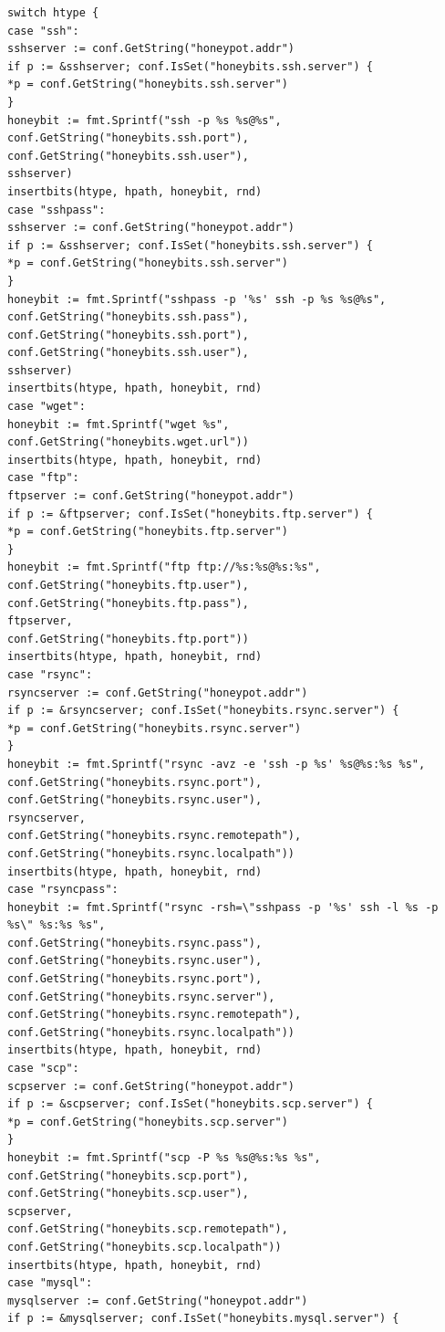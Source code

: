 \documentclass[grad,lot,lof,11pt,oneside,onehalfspace]{RUthesis}
\begin{document}
\begin{lstlisting}
switch htype {
case "ssh":
sshserver := conf.GetString("honeypot.addr")
if p := &sshserver; conf.IsSet("honeybits.ssh.server") {
*p = conf.GetString("honeybits.ssh.server")
}
honeybit := fmt.Sprintf("ssh -p %s %s@%s",
conf.GetString("honeybits.ssh.port"),
conf.GetString("honeybits.ssh.user"),
sshserver)
insertbits(htype, hpath, honeybit, rnd)
case "sshpass":
sshserver := conf.GetString("honeypot.addr")
if p := &sshserver; conf.IsSet("honeybits.ssh.server") {
*p = conf.GetString("honeybits.ssh.server")
}
honeybit := fmt.Sprintf("sshpass -p '%s' ssh -p %s %s@%s",
conf.GetString("honeybits.ssh.pass"),
conf.GetString("honeybits.ssh.port"),
conf.GetString("honeybits.ssh.user"),
sshserver)
insertbits(htype, hpath, honeybit, rnd)
case "wget":
honeybit := fmt.Sprintf("wget %s",
conf.GetString("honeybits.wget.url"))
insertbits(htype, hpath, honeybit, rnd)
case "ftp":
ftpserver := conf.GetString("honeypot.addr")
if p := &ftpserver; conf.IsSet("honeybits.ftp.server") {
*p = conf.GetString("honeybits.ftp.server")
}
honeybit := fmt.Sprintf("ftp ftp://%s:%s@%s:%s",
conf.GetString("honeybits.ftp.user"),
conf.GetString("honeybits.ftp.pass"),
ftpserver,
conf.GetString("honeybits.ftp.port"))
insertbits(htype, hpath, honeybit, rnd)
case "rsync":
rsyncserver := conf.GetString("honeypot.addr")
if p := &rsyncserver; conf.IsSet("honeybits.rsync.server") {
*p = conf.GetString("honeybits.rsync.server")
}
honeybit := fmt.Sprintf("rsync -avz -e 'ssh -p %s' %s@%s:%s %s",
conf.GetString("honeybits.rsync.port"),
conf.GetString("honeybits.rsync.user"),
rsyncserver,
conf.GetString("honeybits.rsync.remotepath"),
conf.GetString("honeybits.rsync.localpath"))
insertbits(htype, hpath, honeybit, rnd)
case "rsyncpass":
honeybit := fmt.Sprintf("rsync -rsh=\"sshpass -p '%s' ssh -l %s -p %s\" %s:%s %s",
conf.GetString("honeybits.rsync.pass"),
conf.GetString("honeybits.rsync.user"),
conf.GetString("honeybits.rsync.port"),
conf.GetString("honeybits.rsync.server"),
conf.GetString("honeybits.rsync.remotepath"),
conf.GetString("honeybits.rsync.localpath"))
insertbits(htype, hpath, honeybit, rnd)
case "scp":
scpserver := conf.GetString("honeypot.addr")
if p := &scpserver; conf.IsSet("honeybits.scp.server") {
*p = conf.GetString("honeybits.scp.server")
}
honeybit := fmt.Sprintf("scp -P %s %s@%s:%s %s",
conf.GetString("honeybits.scp.port"),
conf.GetString("honeybits.scp.user"),
scpserver,
conf.GetString("honeybits.scp.remotepath"),
conf.GetString("honeybits.scp.localpath"))
insertbits(htype, hpath, honeybit, rnd)
case "mysql":
mysqlserver := conf.GetString("honeypot.addr")
if p := &mysqlserver; conf.IsSet("honeybits.mysql.server") {

\end{lstlisting}
\end{document}
